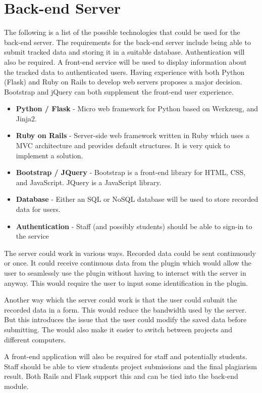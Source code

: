 \section{Back-end Server}
The following is a list of the possible technologies that could be used for the back-end server. The requirements for the back-end server include being able to submit tracked data and storing it in a suitable database. Authentication will also be required. A front-end service will be used to display information about the tracked data to authenticated users. Having experience with both Python (Flask) and Ruby on Rails to develop web servers proposes a major decision. Bootstrap and jQuery can both supplement the front-end user experience.

\begin{itemize}
  \item \textbf{Python / Flask} - Micro web framework for Python based on Werkzeug, and Jinja2.
  \item \textbf{Ruby on Rails} - Server-side web framework written in Ruby which uses a MVC architecture and provides default structures. It is very quick to implement a solution.
  \item \textbf{Bootstrap / JQuery} - Bootstrap is a front-end library for HTML, CSS, and JavaScript. JQuery is a JavaScript library.
  \item \textbf{Database} - Either an SQL or NoSQL database will be used to store recorded data for users.
  \item \textbf{Authentication} - Staff (and possibly students) should be able to sign-in to the service
\end{itemize}

The server could work in various ways. Recorded data could be sent continuously or once. It could receive continuous data from the plugin which would allow the user to seamlessly use the plugin without having to interact with the server in anyway. This would require the user to input some identification in the plugin.

Another way which the server could work is that the user could submit the recorded data in a form. This would reduce the bandwidth used by the server. But this introduces the issue that the user could modify the saved data before submitting. The would also make it easier to switch between projects and different computers.

A front-end application will also be required for staff and potentially students. Staff should be able to view students project submissions and the final plagiarism result. Both Rails and Flask support this and can be tied into the back-end module.

